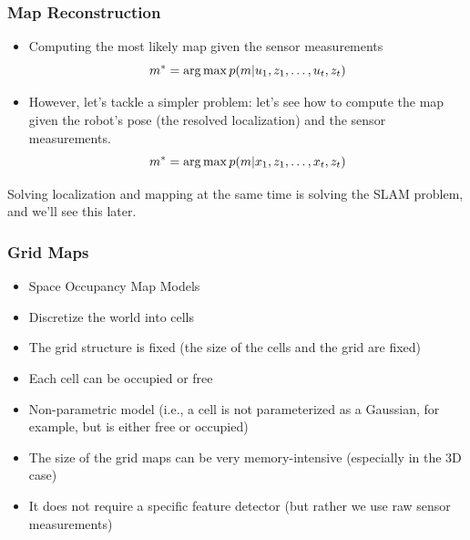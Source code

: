 \begin{frame}
    \frametitle{Map Reconstruction}
    
    \begin{itemize}
    \item Computing the most likely map given the sensor measurements
    \begin{equation*}
    m^{*} = \operatorname*{arg\,max} p(m | u_{1}, z_{1}, \dots, u_{t}, z_{t})
    \end{equation*}
    \item However, let's tackle a simpler problem: let's see how to compute the map given the robot's pose (the resolved localization) and the sensor measurements.
    \begin{equation*}
    m^{*} = \operatorname*{arg\,max} p(m | x_{1}, z_{1}, \dots, x_{t}, z_{t})
    \end{equation*}
    \end{itemize}
    
    \alert{Solving localization and mapping at the same time is solving the SLAM problem, and we'll see this later.}
    
\end{frame}
    
\begin{frame}
    \frametitle{Grid Maps}
    
    \note{}
    
    \begin{itemize}
    \item Space Occupancy Map Models
    \item Discretize the world into cells
    \item The grid structure is fixed (the size of the cells and the grid are fixed)
    \item Each cell can be occupied or free
    \item Non-parametric model (i.e., a cell is not parameterized as a Gaussian, for example, but is either free or occupied)
    \item The size of the grid maps can be very memory-intensive (especially in the 3D case)
    \item It does not require a specific feature detector (but rather we use raw sensor measurements)
    \end{itemize}
\end{frame}
    
